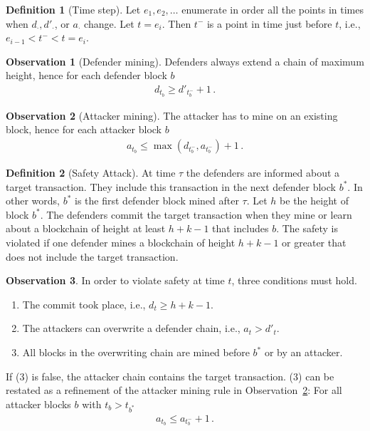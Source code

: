 \documentclass{article}
\theoremstyle{definition}
\newtheorem{definition}{Definition}
\newtheorem{observation}{Observation}
\begin{document}
\begin{definition}[Time step]
  Let $e_1, e_2, \dots$ enumerate in order all the points in times when $d_\cdot, d'_\cdot$, or $a_\cdot$ change.
  Let $t = e_i$. Then $t^-$ is a point in time just before $t$, i.e., $e_{i-1} < t^- < t =  e_i$.
\end{definition}

\begin{observation}[Defender mining]
  Defenders always extend a chain of maximum height, hence for each defender block $b$
  \begin{align}
    d_{t_b} \geq d'_{t^-_b} + 1\,.
  \end{align}
\end{observation}

\begin{observation}[Attacker mining] \label{obs:attackermining}
  The attacker has to mine on an existing block, hence for each attacker block $b$
  \begin{align}
    a_{t_b} \leq \max\left(d_{t_{b}^-}, a_{t_{b}^-}\right) + 1\,.
  \end{align}
\end{observation}

\begin{definition}[Safety Attack]
  At time $\tau$ the defenders are informed about a target transaction.
  They include this transaction in the next defender block $b^*$.
  In other words, $b^*$ is the first defender block mined after $\tau$.
  Let $h$ be the height of block $b^*$.
  The defenders commit the target transaction when they mine or learn about a blockchain of height at least $h + k - 1$ that includes $b$.
  The safety is violated if one defender mines a blockchain of height $h + k - 1$ or greater that does not include the target transaction.
\end{definition}

\begin{observation}
  In order to violate safety at time $t$, three conditions must hold.
  \begin{enumerate}
    \item The commit took place, i.e., $d_t \geq h + k - 1$.
    \item The attackers can overwrite a defender chain, i.e., $a_t > d'_t$.
    \item All blocks in the overwriting chain are mined before $b^*$ or by an attacker.
  \end{enumerate}
  If (3) is false, the attacker chain contains the target transaction.
  (3) can be restated as a refinement of the attacker mining rule in Observation~\ref{obs:attackermining}:
  For all attacker blocks $b$ with $t_b > t_{b^*}$
  \begin{align}
    a_{t_b} \leq a_{t_{b}^-} + 1 \,.
  \end{align}
\end{observation}
\end{document}
